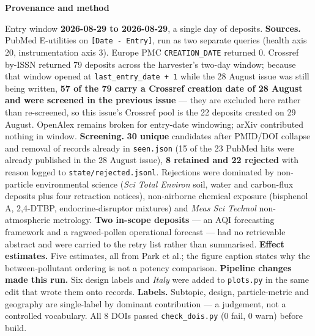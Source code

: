 \documentclass[10pt]{article}
\begin{document}
\vspace{4mm}
\begin{keybox}
{\sffamily\bfseries\footnotesize\color{Deep}Provenance and method}\\[1.2mm]
{\fontsize{7.2}{8.8}\selectfont
Entry window \textbf{2026-08-29 to 2026-08-29}, a single day of deposits.
\textbf{Sources.} PubMed E-utilities on \texttt{[Date - Entry]}, run as two separate
queries (health axis 20, instrumentation axis 3). Europe PMC \texttt{CREATION\_DATE}
returned 0. Crossref by-ISSN returned 79 deposits across the harvester's two-day window;
because that window opened at \texttt{last\_entry\_date + 1} while the 28 August issue was
still being written, \textbf{57 of the 79 carry a Crossref creation date of 28 August and
were screened in the previous issue} --- they are excluded here rather than re-screened,
so this issue's Crossref pool is the 22 deposits created on 29 August. OpenAlex remains
broken for entry-date windowing; arXiv contributed nothing in window.
\textbf{Screening.} \textbf{30 unique} candidates after PMID/DOI collapse and removal of
records already in \texttt{seen.json} (15 of the 23 PubMed hits were already published in
the 28 August issue), \textbf{8 retained and 22 rejected} with reason
logged to \texttt{state/rejected.jsonl}. Rejections were dominated by non-particle
environmental science (\textit{Sci Total Environ} soil, water and carbon-flux deposits
plus four retraction notices), non-airborne chemical exposure (bisphenol A, 2,4-DTBP,
endocrine-disruptor mixtures) and \textit{Meas Sci Technol} non-atmospheric metrology.
\textbf{Two in-scope deposits} --- an AQI forecasting framework and a ragweed-pollen
operational forecast --- had no retrievable abstract and were carried to the retry list
rather than summarised.
\textbf{Effect estimates.} Five estimates, all from Park et al.; the figure caption states
why the between-pollutant ordering is not a potency comparison.
\textbf{Pipeline changes made this run.} Six design labels and \textit{Italy} were added
to \texttt{plots.py} in the same edit that wrote them onto records.
\textbf{Labels.} Subtopic, design, particle-metric and geography are single-label by
dominant contribution --- a judgement, not a controlled vocabulary. All 8 DOIs passed
\texttt{check\_dois.py} (0 fail, 0 warn) before build.\par}
\end{keybox}
\end{document}
